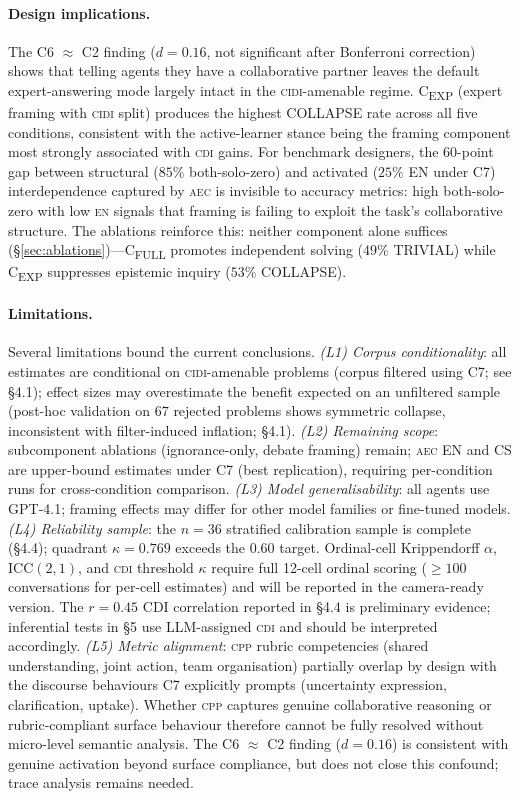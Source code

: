 \documentclass{article}
\newcommand{\CDI}{\textsc{cdi}}
\newcommand{\CPP}{\textsc{cpp}}
\newcommand{\CIDI}{\textsc{cidi}}
\newcommand{\AEC}{\textsc{aec}}
\newcommand{\EN}{\textsc{en}}
\begin{document}
\paragraph{Design implications.}
The C6 $\approx$ C2 finding ($d = 0.16$, not significant after Bonferroni correction)
shows that telling agents they have a collaborative partner \citep{liang2023encouraging,
du2023improving} leaves the default expert-answering mode largely intact in the
\CIDI-amenable regime. C\textsubscript{EXP} (expert framing with \CIDI{} split)
produces the highest COLLAPSE rate across all five conditions, consistent with
the active-learner stance being the framing component most strongly associated with \CDI{} gains.
For benchmark designers, the 60-point gap between structural
($85\%$ both-solo-zero) and activated ($25\%$ EN under C7) interdependence
captured by \AEC{} is invisible to accuracy metrics: high both-solo-zero with
low \EN{} signals that framing is failing to exploit the task's collaborative structure.
The ablations reinforce this: neither component alone suffices
(§\ref{sec:ablations})---C\textsubscript{FULL} promotes independent solving
($49\%$ TRIVIAL) while C\textsubscript{EXP} suppresses epistemic inquiry ($53\%$ COLLAPSE).

\paragraph{Limitations.}
Several limitations bound the current conclusions.
\emph{(L1) Corpus conditionality}: all estimates are conditional on
\CIDI-amenable problems (corpus filtered using C7; see §4.1); effect
sizes may overestimate the benefit expected on an unfiltered sample
(post-hoc validation on $67$ rejected problems shows symmetric collapse,
inconsistent with filter-induced inflation; §4.1).
\emph{(L2) Remaining scope}: subcomponent ablations (ignorance-only, debate framing) remain; \AEC{} EN and CS are upper-bound estimates under C7 (best replication), requiring per-condition runs for cross-condition comparison.
\emph{(L3) Model generalisability}: all agents use GPT-4.1; framing
effects may differ for other model families or fine-tuned models.
\emph{(L4) Reliability sample}: the $n=36$ stratified calibration sample
is complete (§4.4); quadrant $\kappa{=}0.769$ exceeds the $0.60$ target.
Ordinal-cell Krippendorff $\alpha$, ICC$(2,1)$, and \CDI{} threshold
$\kappa$ require full 12-cell ordinal scoring ($\geq 100$ conversations for
per-cell estimates) and will be reported in the camera-ready version.
The $r=0.45$ CDI correlation reported in §4.4 is preliminary evidence;
inferential tests in §5 use LLM-assigned \CDI{} and should be interpreted
accordingly.
\emph{(L5) Metric alignment}: \CPP{} rubric competencies (shared
understanding, joint action, team organisation) partially overlap by
design with the discourse behaviours C7 explicitly prompts (uncertainty
expression, clarification, uptake). Whether \CPP{} captures genuine
collaborative reasoning or rubric-compliant surface behaviour therefore
cannot be fully resolved without micro-level semantic analysis. The
C6 $\approx$ C2 finding ($d{=}0.16$) is consistent with genuine
activation beyond surface compliance, but does not close this confound;
trace analysis remains needed.
\end{document}
